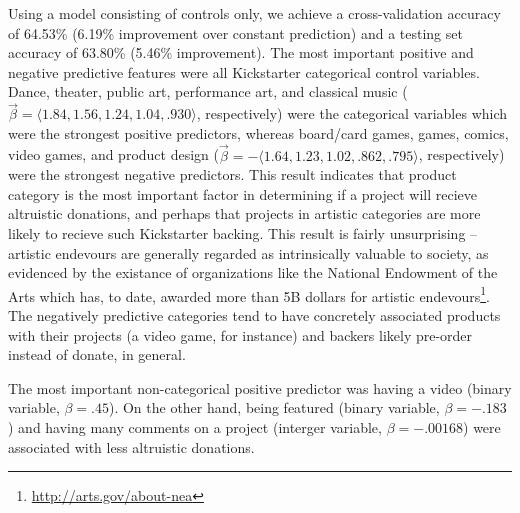 \documentclass[letterpaper]{article}
\begin{document}
Using a model consisting of controls only, we achieve a cross-validation accuracy of 64.53\% (6.19\% improvement over constant prediction) and a testing set accuracy of 63.80\% (5.46\% improvement). The most important positive and negative predictive features were all Kickstarter categorical control variables. Dance, theater, public art, performance art, and classical music ($\vec{\beta} = \langle 1.84, 1.56, 1.24, 1.04, .930 \rangle$, respectively) were the categorical variables which were the strongest positive predictors, whereas board/card games, games, comics, video games, and product design ($\vec{\beta} = -\langle 1.64, 1.23, 1.02, .862, .795 \rangle$, respectively) were the strongest negative predictors. This result indicates that product category is the most important factor in determining if a project will recieve altruistic donations, and perhaps that projects in artistic categories are more likely to recieve such Kickstarter backing. This result is fairly unsurprising -- artistic endevours are generally regarded as intrinsically valuable to society, as evidenced by the existance of organizations like the National Endowment of the Arts which has, to date, awarded more than 5B dollars for artistic endevours\footnote{\url{http://arts.gov/about-nea}}. The negatively predictive categories tend to have concretely associated products with their projects (a video game, for instance) and backers likely pre-order instead of donate, in general.

The most important non-categorical positive predictor was having a video (binary variable, $\beta = .45$). On the other hand, being featured (binary variable, $\beta = -.183$) and having many comments on a project (interger variable, $\beta = -.00168$) were associated with less altruistic donations.
\end{document}
